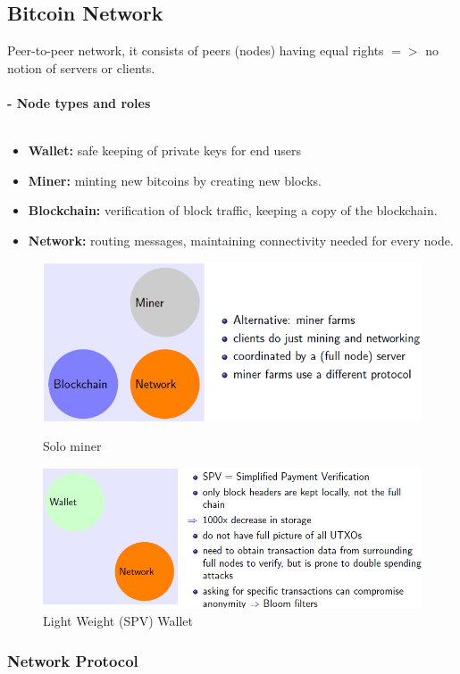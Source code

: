 \documentclass{article}
\begin{document}
\subsection{Bitcoin Network}
Peer-to-peer network, it consists of peers (nodes) having equal rights $=>$ no notion of servers or clients.\\\\
\textbf{- Node types and roles}\\\\
\begin{itemize}
\item \textbf{Wallet: } safe keeping of private keys for end users
\item \textbf{Miner: }minting new bitcoins by creating new blocks.
\item\textbf{Blockchain: }verification of block traffic, keeping a copy of the blockchain.
\item \textbf{Network: }routing messages, maintaining connectivity needed for every node.
\end{itemize}
\begin{figure}
\includegraphics[scale=0.6]{28.png}
\caption{Solo miner}
\includegraphics[scale=0.6]{29.png}
\caption{Light Weight (SPV) Wallet}
\end{figure}
\subsubsection{Network Protocol}
\end{document}
